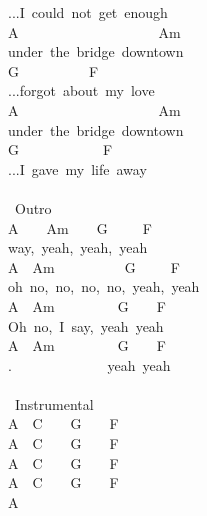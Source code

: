 {...I\ could\ not\ get\ enough\\
A\ \ \ \ \ \ \ \ \ \ \ \ \ \ \ \ \ \ \ \ Am\\
under\ the\ bridge\ downtown\\
G\ \ \ \ \ \ \ \ \ \ F\\
...forgot\ about\ my\ love\\
A\ \ \ \ \ \ \ \ \ \ \ \ \ \ \ \ \ \ \ \ Am\\
under\ the\ bridge\ downtown\\
G\ \ \ \ \ \ \ \ \ \ \ \ F\\
...I\ gave\ my\ life\ away\\
\\
\lbrack\ Outro\rbrack\\
A\ \ \ \ Am\ \ \ \ G\ \ \ \ \ F\\
way,\ yeah,\ yeah,\ yeah\\
A\ \ Am\ \ \ \ \ \ \ \ \ \ G\ \ \ \ \ F\\
oh\ no,\ no,\ no,\ no,\ yeah,\ yeah\\
A\ \ Am\ \ \ \ \ \ \ \ \ G\ \ \ \ F\\
Oh\ no,\ I\ say,\ yeah\ yeah\\
A\ \ Am\ \ \ \ \ \ \ \ \ G\ \ \ \ F\\
. \ \ \ \ \ \ \ \ \ \ \ \ \ yeah\ yeah\\
\\
\lbrack\ Instrumental\rbrack\\
A\ \ C\ \ \ \ G\ \ \ \ F\\
A\ \ C\ \ \ \ G\ \ \ \ F\\
A\ \ C\ \ \ \ G\ \ \ \ F\\
A\ \ C\ \ \ \ G\ \ \ \ F\\
A\ }
